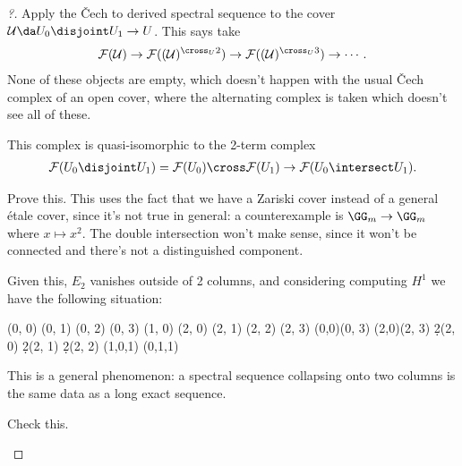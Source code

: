 \begin{proof}[?]

Apply the Čech to derived spectral sequence to the cover
\(\mathcal{U} \da U_0 \disjoint U_1 \to U\). This says take
\begin{align*}  
\mathcal{F}(\mathcal{U}) \to 
\mathcal{F}((\mathcal{U})^{\cross_U 2} ) \to
\mathcal{F}((\mathcal{U})^{\cross_U 3} ) \to
\cdots
.\end{align*} None of these objects are empty, which doesn't happen with
the usual Čech complex of an open cover, where the alternating complex
is taken which doesn't see all of these.

\begin{claim}

This complex is quasi-isomorphic to the 2-term complex
\begin{align*}  
\mathcal{F}(U_0 \disjoint U_1) = \mathcal{F}(U_0) \cross \mathcal{F}(U_1) \to
\mathcal{F}(U_0 \intersect U_1)
.\end{align*}

\end{claim}

\begin{exercise}[?]

Prove this. This uses the fact that we have a Zariski cover instead of a
general étale cover, since it's not true in general: a counterexample is
\(\GG_m \to \GG_m\) where \(x\mapsto x^2\). The double intersection
won't make sense, since it won't be connected and there's not a
distinguished component.

\end{exercise}

Given this, \(E_2\) vanishes outside of 2 columns, and considering
computing \(H^1\) we have the following situation:

\begin{sseqdata}[ name = "2col", xscale=0.6, homological Serre grading, y range = {0}{2}, differentials = blue]
\class(0, 0)
\class(0, 1)
\class(0, 2)
\class(0, 3)
\class(1, 0)
\class(2, 0)
\class(2, 1)
\class(2, 2)
\class(2, 3)
\structline(0,0)(0, 3)
\structline(2,0)(2, 3)
\d2(2, 0)
\d2(2, 1)
\d2(2, 2)
\classoptions[red](1,0,1)
\classoptions[red](0,1,1)
\end{sseqdata}
\begin{center}
\printpage[ name = "2col", page = 2]
\end{center}

This is a general phenomenon: a spectral sequence collapsing onto two
columns is the same data as a long exact sequence.

\begin{exercise}[?]

Check this.

\end{exercise}

\end{proof}

